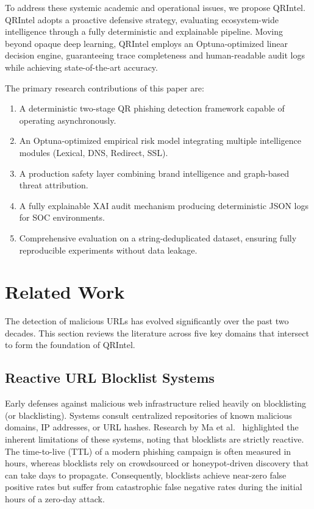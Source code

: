 \documentclass[10pt,twocolumn,letterpaper]{article}
\begin{document}
To address these systemic academic and operational issues, we propose QRIntel. QRIntel adopts a proactive defensive strategy, evaluating ecosystem-wide intelligence through a fully deterministic and explainable pipeline. Moving beyond opaque deep learning, QRIntel employs an Optuna-optimized linear decision engine, guaranteeing trace completeness and human-readable audit logs while achieving state-of-the-art accuracy.

The primary research contributions of this paper are:
\begin{enumerate}
    \item A deterministic two-stage QR phishing detection framework capable of operating asynchronously.
    \item An Optuna-optimized empirical risk model integrating multiple intelligence modules (Lexical, DNS, Redirect, SSL).
    \item A production safety layer combining brand intelligence and graph-based threat attribution.
    \item A fully explainable XAI audit mechanism producing deterministic JSON logs for SOC environments.
    \item Comprehensive evaluation on a string-deduplicated dataset, ensuring fully reproducible experiments without data leakage.
\end{enumerate}

\section{Related Work}
The detection of malicious URLs has evolved significantly over the past two decades. This section reviews the literature across five key domains that intersect to form the foundation of QRIntel.

\subsection{Reactive URL Blocklist Systems}
Early defenses against malicious web infrastructure relied heavily on blocklisting (or blacklisting). Systems consult centralized repositories of known malicious domains, IP addresses, or URL hashes. Research by Ma et al.~\cite{Ma2009} highlighted the inherent limitations of these systems, noting that blocklists are strictly reactive. The time-to-live (TTL) of a modern phishing campaign is often measured in hours, whereas blocklists rely on crowdsourced or honeypot-driven discovery that can take days to propagate. Consequently, blocklists achieve near-zero false positive rates but suffer from catastrophic false negative rates during the initial hours of a zero-day attack.
\end{document}
